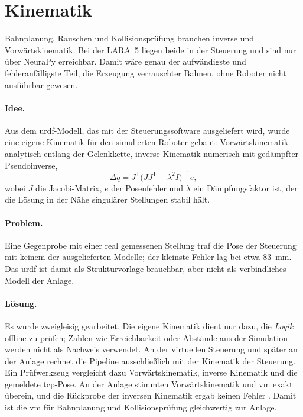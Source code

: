 \section{Kinematik}
\label{sec:kinematik}

Bahnplanung, Rauschen und Kollisionsprüfung brauchen inverse und Vorwärtskinematik. Bei
der LARA~5 liegen beide in der Steuerung und sind nur über NeuraPy erreichbar. Damit wäre
genau der aufwändigste und fehleranfälligste Teil, die Erzeugung verrauschter Bahnen, ohne
Roboter nicht ausführbar gewesen.

\paragraph{Idee.} Aus dem \ac{urdf}-Modell, das mit der Steuerungssoftware ausgeliefert
wird, wurde eine eigene Kinematik für den simulierten Roboter gebaut: Vorwärtskinematik
analytisch entlang der Gelenkkette, inverse Kinematik numerisch mit gedämpfter
Pseudoinverse,
\begin{equation}
  \Delta q = J^{\mathsf T}\bigl(J J^{\mathsf T} + \lambda^2 I\bigr)^{-1} e ,
  \label{eq:dls}
\end{equation}
wobei $J$ die Jacobi-Matrix, $e$ der Posenfehler und $\lambda$ ein Dämpfungsfaktor ist, der
die Lösung in der Nähe singulärer Stellungen stabil hält.

\paragraph{Problem.} Eine Gegenprobe mit einer real gemessenen Stellung traf die Pose der
Steuerung mit keinem der ausgelieferten Modelle; der kleinste Fehler lag bei etwa
\SI{83}{\milli\metre}. Das \ac{urdf} ist damit als Strukturvorlage brauchbar, aber nicht als
verbindliches Modell der Anlage.

\paragraph{Lösung.} Es wurde zweigleisig gearbeitet. Die eigene Kinematik dient nur dazu,
die \emph{Logik} offline zu prüfen; Zahlen wie Erreichbarkeit oder Abstände aus der
Simulation werden nicht als Nachweis verwendet. An der virtuellen Steuerung und später an der
Anlage rechnet die Pipeline ausschließlich mit der Kinematik der Steuerung. Ein
Prüfwerkzeug vergleicht dazu Vorwärtskinematik, inverse Kinematik und die gemeldete
\ac{tcp}-Pose. An der Anlage stimmten Vorwärtskinematik und \ac{vm} exakt überein, und die
Rückprobe der inversen Kinematik ergab keinen Fehler .
Damit ist die \ac{vm} für Bahnplanung und Kollisionsprüfung gleichwertig zur Anlage.

